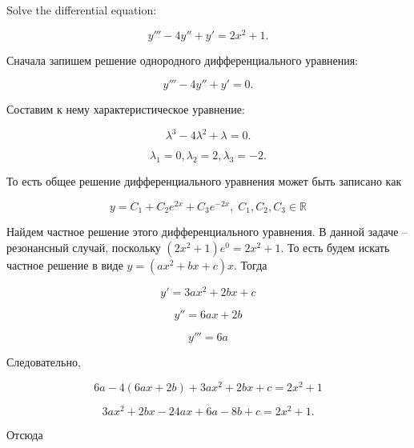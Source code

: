 \documentclass[addpoints, answers]{exam} %
\newcommand{\RR}{\mathbb{R}}
\begin{document}
\begin{questions}

\question Solve the  differential equation:

\[
y''' -4y'' +y' =2x^{2} +1.
\]

\begin{solution}
Сначала запишем решение однородного дифференциального уравнения:

\[y''' -4y'' +y' =0.\]

Составим к нему характеристическое уравнение:

  \[\lambda ^{3} -4\lambda ^{2} +\lambda =0.\]

  \[\lambda _{1} =0,\lambda _{2} =2,\lambda _{3} =-2.\]

  То есть общее решение дифференциального уравнения может быть записано как

  \[y=C_{1} +C_{2} e^{2x} +C_{3} e^{-2x},\; C_{1} ,C_{2} ,C_{3} \in \RR \]

  Найдем частное решение этого дифференциального уравнения. В данной задаче -- резонансный случай, поскольку $\left(2x^{2} +1\right)e^{0} =2x^{2} +1$. То есть будем искать частное решение в виде $y=(ax^{2} +bx+c)x$. Тогда

  \[y' =3ax^{2} +2bx+c\]

  \[y'' =6ax+2b\]

  \[y''' =6a\]

  Следовательно,

  \[6a-4(6ax+2b)+3ax^{2} +2bx+c=2x^{2} +1\]

  \[3ax^{2} +2bx-24ax+6a-8b+c=2x^{2} +1.\]

  Отсюда


\end{solution}
\end{questions}
\end{document}
